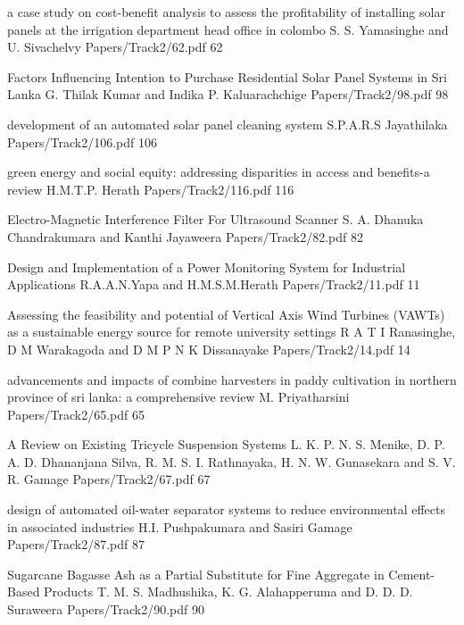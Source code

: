 




\addpaper
{a case study on cost-benefit analysis to assess the profitability of installing solar panels at the irrigation department head office in colombo}
{S. S. Yamasinghe and U. Sivachelvy}
{Papers/Track2/62.pdf}
{62}


\addpaper
{Factors Influencing Intention to Purchase Residential Solar Panel Systems in Sri Lanka}
{G. Thilak Kumar and Indika P. Kaluarachchige}
{Papers/Track2/98.pdf}
{98}


     \addpaper
 	{development of an automated solar panel cleaning system}
		 {S.P.A.R.S Jayathilaka} 
		 {Papers/Track2/106.pdf}
     {106} 


     \addpaper
 	{green energy and social equity: addressing disparities in access and benefits-a review}
		 {H.M.T.P. Herath} 
		 {Papers/Track2/116.pdf}
     {116} 


     \addpaper
 	{Electro-Magnetic Interference Filter For Ultrasound Scanner}
		 {S. A. Dhanuka Chandrakumara and Kanthi Jayaweera} 
		 {Papers/Track2/82.pdf}
     {82} 


     \addpaper
 	{Design and Implementation of a Power Monitoring System for Industrial Applications}
		 {R.A.A.N.Yapa and H.M.S.M.Herath} 
		 {Papers/Track2/11.pdf}
     {11} 


     \addpaper
 	{Assessing the feasibility and potential of Vertical Axis Wind Turbines (VAWTs) as a sustainable energy source for remote university settings}
		 {R A T I Ranasinghe, D M Warakagoda and D M P N K Dissanayake} 
		 {Papers/Track2/14.pdf}
     {14} 


     \addpaper
 	{advancements and impacts of combine harvesters in paddy cultivation in northern province of sri lanka: a comprehensive review}
		 {M. Priyatharsini} 
		 {Papers/Track2/65.pdf}
     {65} 


     \addpaper
 	{A Review on Existing Tricycle Suspension Systems}
		 {L. K. P. N. S. Menike, D. P. A. D. Dhananjana Silva, R. M. S. I. Rathnayaka,
H. N. W. Gunasekara and S. V. R. Gamage} 
		 {Papers/Track2/67.pdf}
     {67} 


\addpaper
{design of automated oil-water separator systems to reduce environmental effects in associated industries}
{H.I. Pushpakumara and Sasiri Gamage}
{Papers/Track2/87.pdf}
{87}


\addpaper
{Sugarcane Bagasse Ash as a Partial Substitute for Fine Aggregate in Cement-Based Products}
{T. M. S. Madhushika, K. G. Alahapperuma and D. D. D. Suraweera}
{Papers/Track2/90.pdf}
{90}


